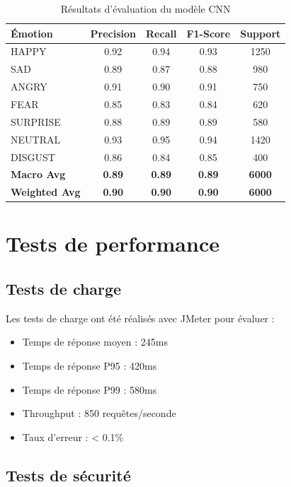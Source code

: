 \documentclass[a4paper,11pt]{report}
\begin{document}
\begin{table}[h]
    \centering
    \begin{tabular}{|l|c|c|c|c|}
    \hline
    \textbf{Émotion} & \textbf{Precision} & \textbf{Recall} & \textbf{F1-Score} & \textbf{Support} \\ \hline
    HAPPY & 0.92 & 0.94 & 0.93 & 1250 \\ \hline
    SAD & 0.89 & 0.87 & 0.88 & 980 \\ \hline
    ANGRY & 0.91 & 0.90 & 0.91 & 750 \\ \hline
    FEAR & 0.85 & 0.83 & 0.84 & 620 \\ \hline
    SURPRISE & 0.88 & 0.89 & 0.89 & 580 \\ \hline
    NEUTRAL & 0.93 & 0.95 & 0.94 & 1420 \\ \hline
    DISGUST & 0.86 & 0.84 & 0.85 & 400 \\ \hline
    \hline
    \textbf{Macro Avg} & \textbf{0.89} & \textbf{0.89} & \textbf{0.89} & \textbf{6000} \\ \hline
    \textbf{Weighted Avg} & \textbf{0.90} & \textbf{0.90} & \textbf{0.90} & \textbf{6000} \\ \hline
    \end{tabular}
    \caption{Résultats d'évaluation du modèle CNN}
    \label{tab:evaluation_model}
\end{table}

\section{Tests de performance}

\subsection{Tests de charge}

Les tests de charge ont été réalisés avec JMeter pour évaluer :

\begin{itemize}
    \item Temps de réponse moyen : 245ms
    \item Temps de réponse P95 : 420ms
    \item Temps de réponse P99 : 580ms
    \item Throughput : 850 requêtes/seconde
    \item Taux d'erreur : < 0.1\%
\end{itemize}

\subsection{Tests de sécurité}
\end{document}
